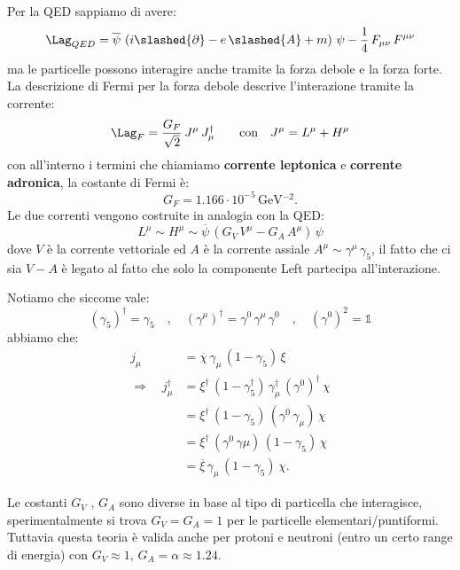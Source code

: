 Per la QED sappiamo di avere:
\begin{equation}
    \Lag_{QED} = \overline{\psi}\, \left( i\slashed{\partial} - e\, \slashed{A} + m \right)\, \psi - \frac{1}{4}\, F_{\mu\nu}\, F^{\mu\nu}
\end{equation}
ma le particelle possono interagire anche tramite la forza debole e la forza forte. La descrizione di Fermi per la forza debole descrive l'interazione tramite la corrente:
\begin{equation}
    \Lag_F = \frac{G_F}{\sqrt{2}}\, J^\mu\, J_\mu^\dagger \qquad \text{con}\quad J^\mu = L^\mu + H^\mu
\end{equation}
con all'interno i termini che chiamiamo \textbf{corrente leptonica} e \textbf{corrente adronica}, la costante di Fermi è:
\begin{equation}
    G_F = 1.166\cdot 10^{-5}\, \unit{\giga\eV^{-2}}.
\end{equation}
Le due correnti vengono costruite in analogia con la QED:
\begin{equation}
    L^\mu \sim H^\mu\sim \overline{\psi}\, \left( G_V\, V^\mu - G_A\, A^\mu \right)\, \psi
\end{equation}
dove $V$ è la corrente vettoriale ed $A$ è la corrente assiale $A^\mu \sim \gamma^\mu\, \gamma_5$, il fatto che ci sia $V-A$ è legato al fatto che solo la componente Left partecipa all'interazione.

Notiamo che siccome vale:
\begin{equation}
    (\gamma_5)^\dagger = \gamma_5 \quad , \quad (\gamma^\mu)^\dagger = \gamma^0\, \gamma^\mu\, \gamma^0 \quad ,\quad (\gamma^0)^2 = \mathbb{1}
\end{equation}
abbiamo che:
\begin{align}
    j_\mu &= \overline{\chi}\, \gamma_\mu\, (1-\gamma_5)\, \xi \\
    \Longrightarrow \quad j_\mu^\dagger &= \xi^\dagger\, \left(1-\gamma_5^\dagger\right)\, \gamma_\mu^\dagger\, (\gamma^0)^\dagger\, \chi \\
    &= \xi^\dagger\, (1-\gamma_5)\, (\gamma^0\, \gamma_\mu)\, \chi \\
    &= \xi^\dagger\, (\gamma^0\, \gamma\mu)\, (1-\gamma_5)\, \chi \\
    &= \overline{\xi}\, \gamma_\mu\, (1-\gamma_5)\, \chi.
\end{align}

Le costanti $G_V$ , $G_A$ sono diverse in base al tipo di particella che interagisce, sperimentalmente si trova $G_V = G_A = 1$ per le particelle elementari/puntiformi. Tuttavia questa teoria è valida anche per protoni e neutroni (entro un certo range di energia) con $G_V\approx 1$, $G_A=\alpha\approx 1.24$.

